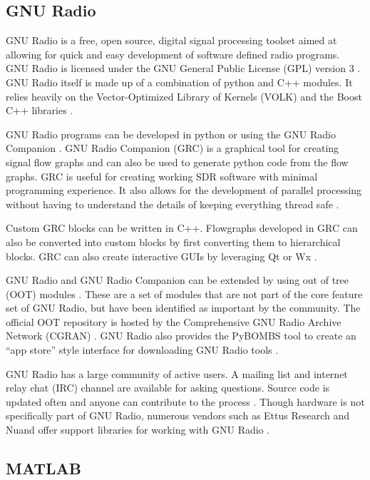 \subsection{GNU Radio}

GNU Radio is a free, open source, digital signal processing toolset aimed at allowing for quick and easy development of software defined radio programs. GNU Radio is licensed under the GNU General Public License (GPL) version 3 \cite{0019}. GNU Radio itself is made up of a combination of python and C++ modules. It relies heavily on the Vector-Optimized Library of Kernels (VOLK) \cite{0021} and the Boost C++ libraries \cite{0022}. 

GNU Radio programs can be developed in python or using the GNU Radio Companion \cite{0023}. GNU Radio Companion (GRC) is a graphical tool for creating signal flow graphs and can also be used to generate python code from the flow graphs. GRC is useful for creating working SDR software with minimal programming experience. It also allows for the development of parallel processing without having to understand the details of keeping everything thread safe \cite{0023}.

Custom GRC blocks can be written in C++. Flowgraphs developed in GRC can also be converted into custom blocks by first converting them to hierarchical blocks. GRC can also create interactive GUIs by leveraging Qt or Wx \cite{0023}. 

GNU Radio and GNU Radio Companion can be extended by using out of tree (OOT) modules \cite{0024}. These are a set of modules that are not part of the core feature set of GNU Radio, but have been identified as important by the community. The official OOT repository is hosted by the Comprehensive GNU Radio Archive Network (CGRAN) \cite{0025}. GNU Radio also provides the PyBOMBS tool to create an ``app store'' style interface for downloading GNU Radio tools \cite{0024}. 

GNU Radio has a large community of active users. A mailing list and internet relay chat (IRC) channel are available for asking questions. Source code is updated often and anyone can contribute to the process \cite{0003}. Though hardware is not specifically part of GNU Radio, numerous vendors such as Ettus Research and Nuand offer support libraries for working with GNU Radio \cite{0026}. 

\subsection{MATLAB}

